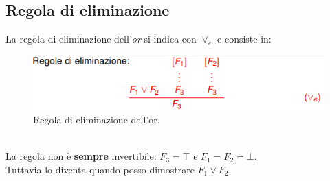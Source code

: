 \documentclass[12pt]{article}
\begin{document}
\subsection{Regola di eliminazione}
\label{ssec:or_elim}
La regola di eliminazione dell'\textit{or} si indica con $\vee_e$ e consiste in:
\begin{figure}[!htb]
    \centering
    \includegraphics[width=.9\linewidth,height=.40\textheight,keepaspectratio]{logica_proposizionale/introduzione/eliminazione_or.png} %
    \begin{center}
        \caption{\label{fig:eliminazione_or}Regola di eliminazione dell'or.} %
    \end{center}
\end{figure}\\
La regola non è \textbf{sempre} invertibile: $F_3 = \top$ e $F_1 = F_2 = \bot$.\\
Tuttavia lo diventa quando posso dimostrare $F_1 \vee F_2$.
\end{document}
